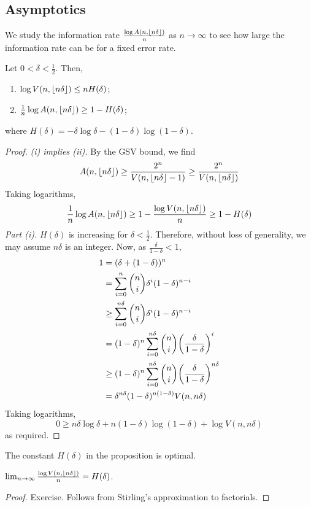 \subsection{Asymptotics}
We study the information rate \( \frac{\log A(n,\lfloor n\delta\rfloor)}{n} \) as \( n \to \infty \) to see how large the information rate can be for a fixed error rate.
\begin{proposition}
    Let \( 0 < \delta < \frac{1}{2} \).
    Then,
    \begin{enumerate}
        \item \( \log V(n,\lfloor n\delta\rfloor) \leq nH(\delta) \);
        \item \( \frac{1}{n} \log A(n,\lfloor n\delta\rfloor) \geq 1 - H(\delta) \);
    \end{enumerate}
    where \( H(\delta) = -\delta \log \delta - (1-\delta)\log (1-\delta) \).
\end{proposition}
\begin{proof}
    \emph{(i) implies (ii).}
    By the GSV bound, we find
    \[ A(n,\lfloor n\delta\rfloor) \geq \frac{2^n}{V(n,\lfloor n\delta\rfloor - 1)} \geq \frac{2^n}{V(n,\lfloor n\delta\rfloor)} \]
    Taking logarithms,
    \[ \frac{1}{n}\log A(n,\lfloor n\delta\rfloor) \geq 1 - \frac{\log V(n,\lfloor n\delta\rfloor)}{n} \geq 1 - H(\delta) \]
    \emph{Part (i).}
    \( H(\delta) \) is increasing for \( \delta < \frac{1}{2} \).
    Therefore, without loss of generality, we may assume \( n\delta \) is an integer.
    Now, as \( \frac{\delta}{1-\delta} < 1 \),
    \begin{align*}
        1 &= (\delta + (1-\delta))^n \\
        &= \sum_{i=0}^n \binom{n}{i} \delta^i (1-\delta)^{n-i} \\
        &\geq \sum_{i=0}^{n\delta} \binom{n}{i} \delta^i (1-\delta)^{n-i} \\
        &= (1-\delta)^n \sum_{i=0}^{n\delta} \binom{n}{i} \qty(\frac{\delta}{1-\delta})^i \\
        &\geq (1-\delta)^n \sum_{i=0}^{n\delta} \binom{n}{i} \qty(\frac{\delta}{1-\delta})^{n\delta} \\
        &= \delta^{n\delta} (1-\delta)^{n(1-\delta)} V(n,n\delta)
    \end{align*}
    Taking logarithms,
    \[ 0 \geq n\delta \log \delta + n(1-\delta) \log(1-\delta) + \log V(n,n\delta) \]
    as required.
\end{proof}
The constant \( H(\delta) \) in the proposition is optimal.
\begin{lemma}
    \( \lim_{n \to \infty} \frac{\log V(n,\lfloor n\delta\rfloor)}{n} = H(\delta) \).
\end{lemma}
\begin{proof}
    Exercise.
    Follows from Stirling's approximation to factorials.
\end{proof}

